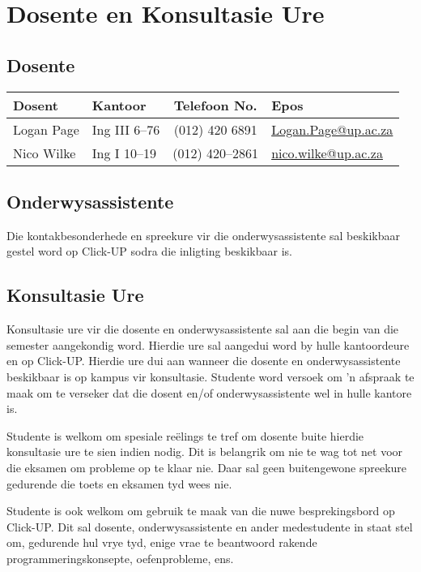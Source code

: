 \section{Dosente en Konsultasie Ure}
    \subsection{Dosente}
        \begin{table}[!h]
            \begin{center}
             \begin{tabular}{|l|l|c|l|}
                 \hline
                 {\bf Dosent} & {\bf Kantoor} & {\bf Telefoon No.} & {\bf Epos} \\
                 \hline
                 Logan Page &
                 Ing III 6--76 &
                 (012) 420 6891 &
                 \href{mailto:Logan.Page@up.ac.za}{Logan.Page@up.ac.za} \\
                 Nico Wilke &
                 Ing I 10--19 &
                 (012) 420--2861 &
                 \href{mailto:nico.wilke@up.ac.za}{nico.wilke@up.ac.za} \\
                 \hline
             \end{tabular}
            \end{center}
        \end{table}
    
    \subsection{Onderwysassistente}
	Die kontakbesonderhede en spreekure vir die onderwysassistente sal
	beskikbaar gestel word op Click-UP sodra die inligting beskikbaar is.
    
    \subsection{Konsultasie Ure}
        Konsultasie ure vir die dosente en onderwysassistente sal aan die begin 
        van die semester aangekondig word.  Hierdie ure sal aangedui word by 
        hulle kantoordeure en op Click-UP.  Hierdie ure dui aan wanneer die 
        dosente en onderwysassistente beskikbaar is op kampus vir konsultasie.
        Studente word versoek om 'n afspraak te maak om te verseker dat die 
        dosent en/of onderwysassistente wel in hulle kantore is.
        
        Studente is welkom om spesiale re\"{e}lings te tref om dosente buite hierdie
        konsultasie ure te sien indien nodig.  Dit is belangrik om nie te wag tot 
        net voor die eksamen om probleme op te klaar nie.  Daar sal geen 
        buitengewone spreekure gedurende die toets en eksamen tyd wees nie.
        
        Studente is ook welkom om gebruik te maak van die nuwe besprekingsbord
        op Click-UP.  Dit sal dosente, onderwysassistente en ander 
        medestudente in staat stel om, gedurende hul vrye tyd, enige vrae te beantwoord rakende 
        programmeringskonsepte, oefenprobleme, ens.
